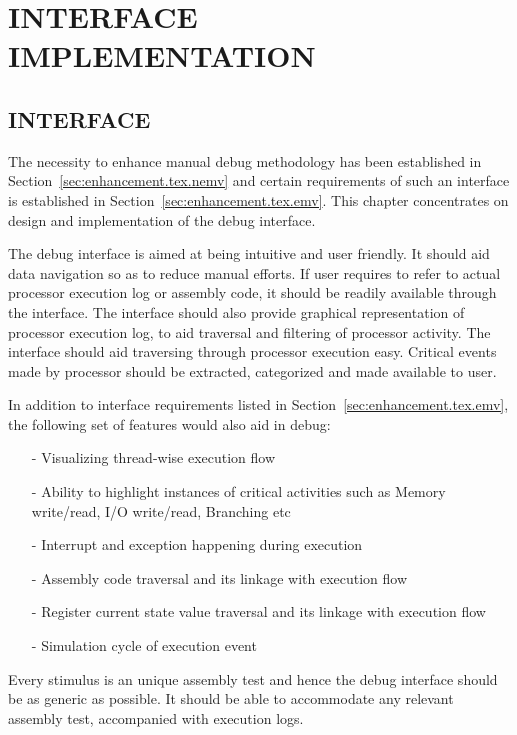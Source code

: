 \chapter{INTERFACE IMPLEMENTATION}
\label{chap:GUI_impl.tex}
\section{INTERFACE}
The necessity to enhance manual debug methodology has been established in Section~\ref{sec:enhancement.tex.nemv} and certain requirements of such an interface is established in Section~\ref{sec:enhancement.tex.emv}. This chapter concentrates on design and implementation of the debug interface.

The debug interface is aimed at being intuitive and user friendly. It should aid data navigation so as to reduce manual efforts. If user requires to refer to actual processor execution log or assembly code, it should be readily available through the interface. The interface should also provide graphical representation of processor execution log, to aid traversal and filtering of processor activity. The interface should aid traversing through processor execution easy.  Critical events made by processor should be extracted, categorized and made available to user.

In addition to interface requirements listed in Section~\ref{sec:enhancement.tex.emv}, the following set of features would also aid in debug:

\begin{itemize}
\item[-] Visualizing thread-wise execution flow
\item[-] Ability to highlight instances of critical activities such as Memory write/read, I/O write/read, Branching etc
\item[-] Interrupt and exception happening during execution
\item[-] Assembly code traversal and its linkage with execution flow
\item[-] Register current state value traversal and its linkage with execution flow
\item[-] Simulation cycle of execution event
\end{itemize}

Every stimulus is an unique assembly test and hence the debug interface should be as generic as possible. It should be able to accommodate any relevant assembly test, accompanied with execution logs.


